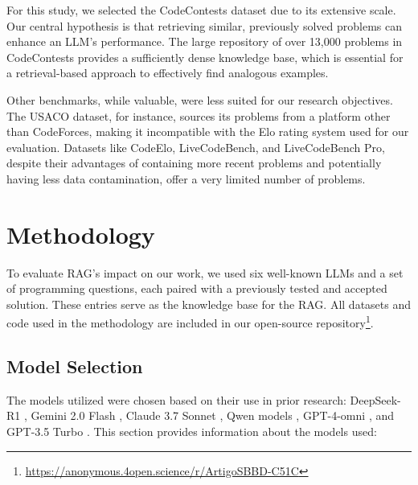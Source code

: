 \documentclass[preprint,12pt]{elsarticle}
\begin{document}
For this study, we selected the CodeContests dataset due to its extensive scale. Our central hypothesis is that retrieving similar, previously solved problems can enhance an LLM's performance. The large repository of over 13,000 problems in CodeContests provides a sufficiently dense knowledge base, which is essential for a retrieval-based approach to effectively find analogous examples.

Other benchmarks, while valuable, were less suited for our research objectives. The USACO dataset, for instance, sources its problems from a platform other than CodeForces, making it incompatible with the Elo rating system used for our evaluation. Datasets like CodeElo, LiveCodeBench, and LiveCodeBench Pro, despite their advantages of containing more recent problems and potentially having less data contamination, offer a very limited number of problems.

\section{Methodology}
\label{sec:methodology}

To evaluate RAG's impact on our work, we used six well-known LLMs and a set of programming questions, each paired with a previously tested and accepted solution. These entries serve as the knowledge base for the RAG. All datasets and code used in the methodology are included in our open-source repository\footnote{\label{fn:repo}\url{https://anonymous.4open.science/r/ArtigoSBBD-C51C}}.

\subsection{Model Selection}
\label{subsec:models}

The models utilized were chosen based on their use in prior research: DeepSeek-R1 \cite{zheng2025livecodebenchproolympiadmedalists, yu2024humanevalprombpppro, deng2025cpretdatasetbenchmarkmodel}, Gemini 2.0 Flash \cite{zheng2025livecodebenchproolympiadmedalists, jain2024livecodebenchholisticcontaminationfree, deng2025cpretdatasetbenchmarkmodel}, Claude 3.7 Sonnet \cite{zheng2025livecodebenchproolympiadmedalists, deng2025cpretdatasetbenchmarkmodel}, Qwen models \cite{zheng2025livecodebenchproolympiadmedalists, jain2024livecodebenchholisticcontaminationfree, yu2024humanevalprombpppro, quan2025codeelobenchmarkingcompetitionlevelcode}, GPT-4-omni \cite{zheng2025livecodebenchproolympiadmedalists, jain2024livecodebenchholisticcontaminationfree, hossain2025llmprosanalyzinglargelanguage, yu2024humanevalprombpppro, quan2025codeelobenchmarkingcompetitionlevelcode, deng2025cpretdatasetbenchmarkmodel}, and GPT-3.5 Turbo \cite{shi2024languagemodelssolveolympiad, jain2024livecodebenchholisticcontaminationfree}. This section provides information about the models used:
\end{document}
